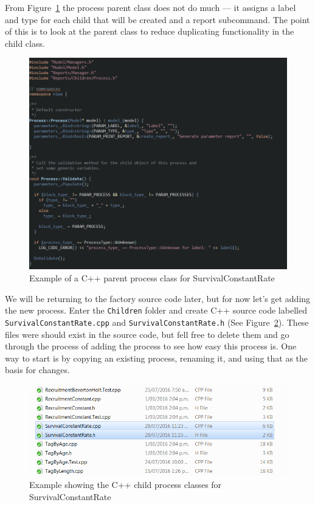 From Figure~\ref{fig:process1} the process parent class does not do much --- it assigns a label and type for each child that will be created and a report subcommand. The point of this is to look at the parent class to reduce duplicating functionality in the child class.

\begin{figure}[H]
	\centering
	\includegraphics[scale=0.6]{Figures/add_survival1.png}
	\caption{Example of a C++ parent process class for SurvivalConstantRate}\label{fig:process1}
\end{figure}

We will be returning to the factory source code later, but for now let's get adding the new process. Enter the \texttt{Children} folder and create C++ source code labelled \texttt{SurvivalConstantRate.cpp} and \texttt{SurvivalConstantRate.h} (See Figure~\ref{fig:process2}). These files were should exist in the source code, but fell free to delete them and go through the process of adding the process to see how easy this process is. One way to start is by copying an existing process, renaming it, and using that as the basis for changes. 

\begin{figure}[H]
	\centering
	\includegraphics[scale=0.6]{Figures/add_survival.png}
	\caption{Example showing the C++ child process classes for SurvivalConstantRate}\label{fig:process2}
\end{figure}

